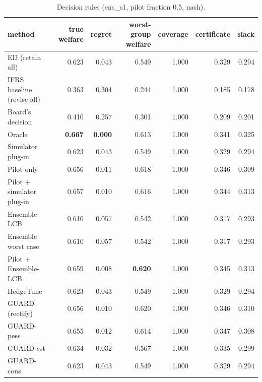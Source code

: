 \begin{table}[t]
\centering
\small
\begin{tabular}{lrrrrrr}
\toprule
method & true welfare & regret & worst-group welfare & coverage & certificate & slack \\
\midrule
ED (retain all) & 0.623 & 0.043 & 0.549 & 1.000 & 0.329 & 0.294 \\
IFRS baseline (revise all) & 0.363 & 0.304 & 0.244 & 1.000 & 0.185 & 0.178 \\
Board's decision & 0.410 & 0.257 & 0.301 & 1.000 & 0.209 & 0.201 \\
Oracle & \textbf{0.667} & \textbf{0.000} & 0.613 & 1.000 & 0.341 & 0.325 \\
Simulator plug-in & 0.623 & 0.043 & 0.549 & 1.000 & 0.329 & 0.294 \\
Pilot only & 0.656 & 0.011 & 0.618 & 1.000 & 0.346 & 0.309 \\
Pilot + simulator plug-in & 0.657 & 0.010 & 0.616 & 1.000 & 0.344 & 0.313 \\
Ensemble-LCB & 0.610 & 0.057 & 0.542 & 1.000 & 0.317 & 0.293 \\
Ensemble worst case & 0.610 & 0.057 & 0.542 & 1.000 & 0.317 & 0.293 \\
Pilot + Ensemble-LCB & 0.659 & 0.008 & \textbf{0.620} & 1.000 & 0.345 & 0.313 \\
HedgeTune & 0.623 & 0.043 & 0.549 & 1.000 & 0.329 & 0.294 \\
GUARD (rectify) & 0.656 & 0.010 & 0.620 & 1.000 & 0.346 & 0.310 \\
GUARD-pess & 0.655 & 0.012 & 0.614 & 1.000 & 0.347 & 0.308 \\
GUARD-est & 0.634 & 0.032 & 0.567 & 1.000 & 0.335 & 0.299 \\
GUARD-cons & 0.623 & 0.043 & 0.549 & 1.000 & 0.329 & 0.294 \\
\bottomrule
\end{tabular}
\caption{Decision rules (ens\_s1, pilot fraction 0.5, nash).}
\label{tab:methods-nash}
\end{table}
